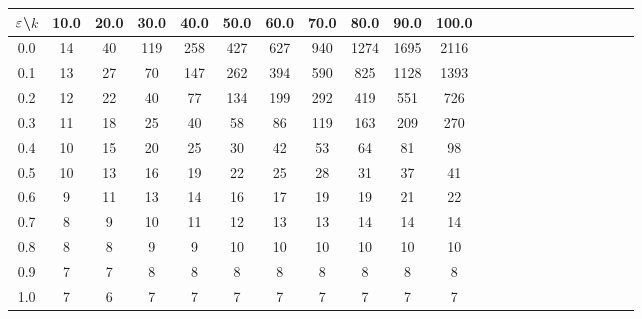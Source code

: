\begin{tabular}{Sc Sc Sc Sc Sc Sc Sc Sc Sc ScSc }
\toprule

$\varepsilon$\textbackslash$k$ &  10.0  &  20.0  &  30.0  &  40.0  &  50.0  &  60.0  &  70.0  &  80.0  &  90.0  &  100.0 \\

\midrule

0.0 &     14 &     40 &    119 &    258 &    427 &    627 &    940 &   1274 &   1695 &   2116 \\

0.1 &     13 &     27 &     70 &    147 &    262 &    394 &    590 &    825 &   1128 &   1393 \\

0.2 &     12 &     22 &     40 &     77 &    134 &    199 &    292 &    419 &    551 &    726 \\

0.3 &     11 &     18 &     25 &     40 &     58 &     86 &    119 &    163 &    209 &    270 \\

0.4 &     10 &     15 &     20 &     25 &     30 &     42 &     53 &     64 &     81 &     98 \\

0.5 &     10 &     13 &     16 &     19 &     22 &     25 &     28 &     31 &     37 &     41 \\

0.6 &      9 &     11 &     13 &     14 &     16 &     17 &     19 &     19 &     21 &     22 \\

0.7 &      8 &      9 &     10 &     11 &     12 &     13 &     13 &     14 &     14 &     14 \\

0.8 &      8 &      8 &      9 &      9 &     10 &     10 &     10 &     10 &     10 &     10 \\

0.9 &      7 &      7 &      8 &      8 &      8 &      8 &      8 &      8 &      8 &      8 \\

1.0 &      7 &      6 &      7 &      7 &      7 &      7 &      7 &      7 &      7 &      7 \\

\bottomrule

\end{tabular}

